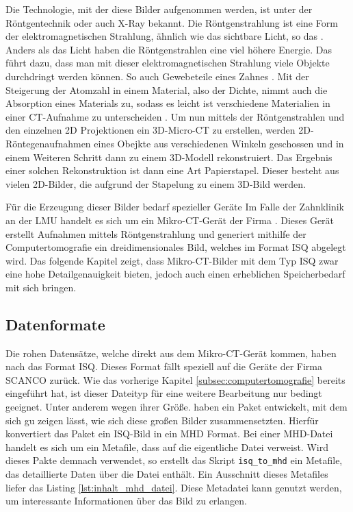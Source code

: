 Die Technologie, mit der diese Bilder aufgenommen werden, ist unter der
Röntgentechnik oder auch \ac{X-Ray} bekannt. Die Röntgenstrahlung ist eine Form
der elektromagnetischen Strahlung, ähnlich wie das sichtbare Licht, so das
\citet[K.~1]{nib2024}. Anders als das Licht haben die Röntgenstrahlen eine viel
höhere Energie. Das führt dazu, dass man mit dieser elektromagnetischen
Strahlung viele Objekte durchdringt werden können. So auch Gewebeteile eines Zahnes
\citep[vgl.][K.~1]{nib2024}. Mit der Steigerung der Atomzahl in einem Material,
also der Dichte, nimmt auch die Absorption eines Materials zu, sodass es leicht
ist verschiedene Materialien in einer \ac{CT}-Aufnahme zu unterscheiden \citep[vgl.][K.~1]{nib2024}.
Um nun mittels der Röntgenstrahlen und den einzelnen \ac{2D} Projektionen ein 3D-Micro-CT
zu erstellen, werden 2D-Röntegenaufnahmen eines Obejkte aus verschiedenen Winkeln
geschossen und in einem Weiteren Schritt dann zu einem 3D-Modell rekonstruiert.
Das Ergebnis einer solchen Rekonstruktion ist dann eine Art Papierstapel. Dieser
besteht aus vielen 2D-Bilder, die aufgrund der Stapelung zu einem 3D-Bild werden.

Für die Erzeugung dieser Bilder bedarf spezieller Geräte Im Falle der Zahnklinik
an der \ac{LMU} handelt es sich um ein Mikro-\ac{CT}-Gerät der Firma \citet{scanco2024}.
Dieses Gerät erstellt Aufnahmen mittels Röntgenstrahlung und generiert mithilfe
der Computertomografie ein dreidimensionales Bild, welches im Format \ac{ISQ}
abgelegt wird. Das folgende Kapitel zeigt, dass Mikro-CT-Bilder mit dem Typ \ac{ISQ}
zwar eine hohe Detailgenauigkeit bieten, jedoch auch einen erheblichen
Speicherbedarf mit sich bringen.

\subsection{Datenformate}
\label{subsec:datensätze} Die rohen Datensätze, welche direkt aus dem Mikro-\ac{CT}-Gerät
kommen, haben nach \citet{scanco2024} das Format \ac{ISQ}. Dieses Format fällt
speziell auf die Geräte der Firma SCANCO zurück. Wie das vorherige Kapitel \ref{subsec:computertomografie}
bereits eingeführt hat, ist dieser Dateityp für eine weitere Bearbeitung nur
bedingt geeignet. Unter anderem wegen ihrer Größe. \citet[S.~118-119]{RoeschKunzelmann2018}
haben ein Paket entwickelt, mit dem sich gu zeigen lässt, wie sich diese großen Bilder
zusammensetzten. Hierfür konvertiert das Paket ein \ac{ISQ}-Bild in ein \ac{MHD}
Format. Bei einer \ac{MHD}-Datei handelt es sich um ein Metafile, dass auf die eigentliche
Datei verweist. Wird dieses Pakte demnach verwendet, so erstellt das Skript \texttt{isq\_to\_mhd}
ein Metafile, das detaillierte Daten über die Datei enthält. Ein Ausschnitt
dieses Metafiles liefer das Listing \ref{lst:inhalt_mhd_datei}. Diese Metadatei kann
genutzt werden, um interessante Informationen über das Bild zu erlangen.

